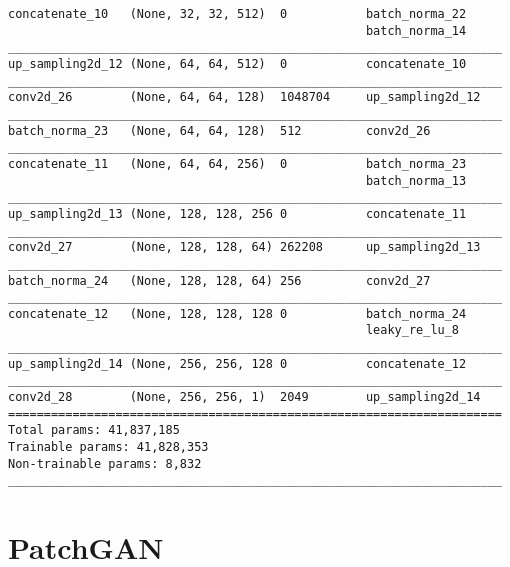\begin{verbatim}
concatenate_10   (None, 32, 32, 512)  0           batch_norma_22
                                                  batch_norma_14
_____________________________________________________________________
up_sampling2d_12 (None, 64, 64, 512)  0           concatenate_10
_____________________________________________________________________
conv2d_26        (None, 64, 64, 128)  1048704     up_sampling2d_12
_____________________________________________________________________
batch_norma_23   (None, 64, 64, 128)  512         conv2d_26
_____________________________________________________________________
concatenate_11   (None, 64, 64, 256)  0           batch_norma_23
                                                  batch_norma_13
_____________________________________________________________________
up_sampling2d_13 (None, 128, 128, 256 0           concatenate_11
_____________________________________________________________________
conv2d_27        (None, 128, 128, 64) 262208      up_sampling2d_13
_____________________________________________________________________
batch_norma_24   (None, 128, 128, 64) 256         conv2d_27
_____________________________________________________________________
concatenate_12   (None, 128, 128, 128 0           batch_norma_24
                                                  leaky_re_lu_8
_____________________________________________________________________
up_sampling2d_14 (None, 256, 256, 128 0           concatenate_12
_____________________________________________________________________
conv2d_28        (None, 256, 256, 1)  2049        up_sampling2d_14
=====================================================================
Total params: 41,837,185
Trainable params: 41,828,353
Non-trainable params: 8,832
_____________________________________________________________________

\end{verbatim}

\section{PatchGAN}
\label{appendix:patch_gan}

